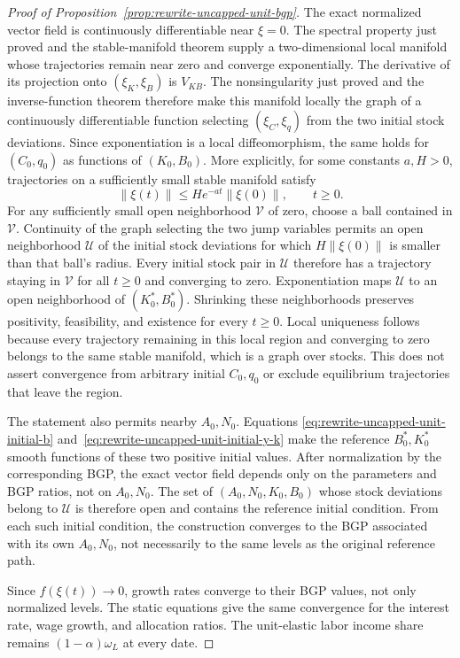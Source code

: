 \begin{proof}[Proof of Proposition~\ref{prop:rewrite-uncapped-unit-bgp}]
The exact normalized vector field is continuously differentiable near
$\xi=0$. The spectral property just proved and the stable-manifold
theorem supply a two-dimensional local manifold
whose trajectories remain near zero and converge exponentially.
The derivative of its projection onto $(\xi_K,\xi_B)$ is $V_{KB}$.
The nonsingularity just proved and the
inverse-function theorem therefore make this manifold locally the
graph of a continuously differentiable function selecting $(\xi_C,\xi_q)$
from the two initial stock deviations. Since exponentiation is a local
diffeomorphism, the same holds for $(C_0,q_0)$ as functions of $(K_0,B_0)$.
More explicitly, for some constants $a,H>0$, trajectories on a sufficiently
small stable manifold satisfy
\[
 \|\xi(t)\|\leq H e^{-at}\|\xi(0)\|,\qquad t\geq0.
\]
For any sufficiently small open neighborhood $\mathcal V$ of zero,
choose a ball contained in $\mathcal V$. Continuity of the graph selecting
the two jump variables permits an open neighborhood $\mathcal U$ of the
initial stock deviations for which $H\|\xi(0)\|$ is smaller than that
ball's radius. Every initial stock pair in $\mathcal U$ therefore has a
trajectory staying in $\mathcal V$ for all $t\geq0$ and converging to zero.
Exponentiation maps $\mathcal U$ to an open neighborhood of
$(K_0^*,B_0^*)$. Shrinking these neighborhoods preserves positivity,
feasibility, and existence for every $t\geq0$. Local uniqueness follows
because every trajectory remaining in this local region and converging
to zero belongs to the same stable manifold, which is a graph over stocks.
This does not assert convergence from arbitrary initial $C_0,q_0$ or
exclude equilibrium trajectories that leave the region.

The statement also permits nearby $A_0,N_0$. Equations
\eqref{eq:rewrite-uncapped-unit-initial-b}
and~\eqref{eq:rewrite-uncapped-unit-initial-y-k} make the reference
$B_0^*,K_0^*$ smooth functions of these two positive initial values.
After normalization by the corresponding BGP, the exact vector field
depends only on the parameters and BGP ratios, not on $A_0,N_0$.
The set of $(A_0,N_0,K_0,B_0)$ whose stock deviations belong to
$\mathcal U$ is therefore open and contains the reference initial condition.
From each such initial condition, the construction converges to the BGP
associated with its own $A_0,N_0$, not necessarily to the same levels as
the original reference path.

Since $f(\xi(t))\to0$, growth rates converge to their BGP values, not only
normalized levels. The static equations give the same convergence for
the interest rate, wage growth, and allocation ratios. The unit-elastic
labor income share remains $(1-\alpha)\omega_L$ at every date.


\end{proof}
